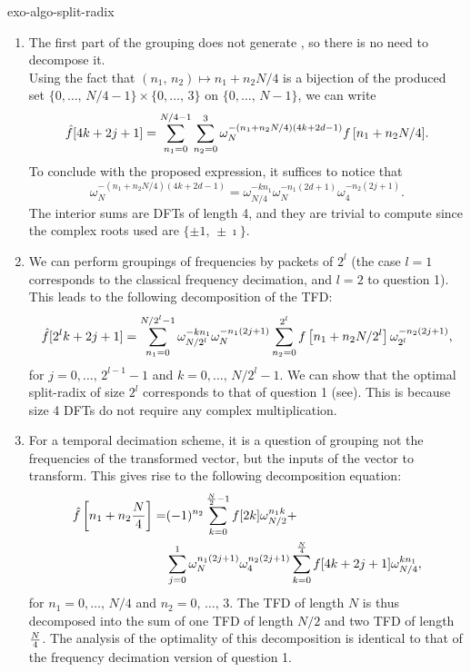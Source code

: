  
\begin{correction}{exo-algo-split-radix}
\begin{enumerate}
\item The first part of the grouping does not generate , so there is no need to decompose it. \\Using the fact that $ (n_1, \, n_2) \mapsto n_1 + n_2 N/4 $ is a bijection of the produced set $ \{0, \ldots, \, N/4-1\} \times \{0, \ldots, \, 3\} $ on $ \{0, \ldots, \, N-1\} $, we can write
\begin{equation*}
\hat{f}[4 k + 2j+1] = \sum_{n_1 = 0}^{N/4-1}{\sum_{n_2 = 0}^3{\omega_N^{- (n_1 + n_2 N/4) (4k + 2d-1)} f \left[n_1 + n_2 N/4 \right]}}.
\end{equation*}
To conclude with the proposed expression, it suffices to notice that
\begin{equation*}
\omega_N^{- (n_1 + n_2 N/4) (4k + 2d-1)} = \omega_{N/4}^{- k n_1} \omega_N^{- n_1 (2d+1)} \omega_4^{-n_2 (2j+1)}.
\end{equation*}
The interior sums are DFTs of length 4, and they are trivial to compute since the complex roots used are $ \{\pm 1, \, \pm \imath\} $.
\item We can perform groupings of frequencies by packets of $ 2^l $ (the case $ l = 1 $ corresponds to the classical frequency decimation, and $ l = 2 $ to question 1). This leads to the following decomposition of the TFD:
\begin{equation*}
\hat{f}[2^l k + 2j+1] = \sum_{n_1 = 0}^{N/2^l-1}{\omega_{N/2^l}^{- k n_1} \omega_N^{- n_1 (2j+1)} \sum_{n_2 = 0}^{2^l}{f \left[n_1 + n_2 N/2^l \right] \omega_{2^l}^{- n_2 (2j+1)}}},
\end{equation*}
for $ j = 0, \ldots, \, 2^{l-1} -1 $ and $ k = 0, \ldots, \, N/2^l-1 $. We can show that the optimal split-radix of size $ 2^l $ corresponds to that of question 1 (see{\upshape \cite{vetterli-split-radix}}). This is because size 4 DFTs do not require any complex multiplication.
\item For a temporal decimation scheme, it is a question of grouping not the frequencies of the transformed vector, but the inputs of the vector to transform. This gives rise to the following decomposition equation:
\begin{align*}
\hat{f} \left[n_1 + n_2 \frac{N}{4} \right] = & (- 1)^{n_2} \sum_{k = 0}^{\frac{N}{2}-1}{f [2 k] \omega_{N/2}^{n_1 k}} + \\
& \sum_{j = 0}^1{\omega_N^{n_1 (2j+1)} \omega_4^{n_2 (2j+1)} \sum_{k = 0}^{\frac{N}{4}}{f [4k + 2j+1] \omega_{N/4}^{k n_1}}},
\end{align*}
for $ n_1 = 0, \ldots, \, N/4 $ and $ n_2 = 0, \, \ldots, \, 3 $. The TFD of length $ N $ is thus decomposed into the sum of one TFD of length $ N/2 $ and two TFD of length $ \frac{N}{4} $. The analysis of the optimality of this decomposition is identical to that of the frequency decimation version of question 1.
\end{enumerate}
\end{correction}
 

